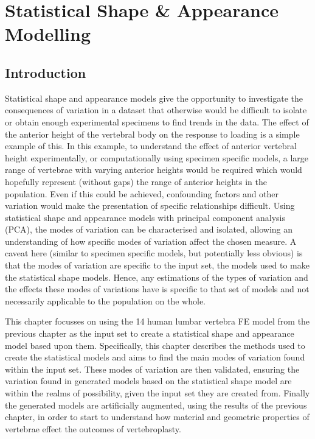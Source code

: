 \chapter{Statistical Shape \& Appearance Modelling}\label{PCA_CHAP}

\section{Introduction}

Statistical shape and appearance models give the opportunity to investigate the
consequences of variation in a dataset that otherwise would be difficult to
isolate or obtain enough experimental specimens to find trends in the data.
The effect of the anterior height of the vertebral body on the response to
loading is a simple example of this. In this example, to understand the effect
of anterior vertebral height experimentally, or computationally using specimen
specific models, a large range of vertebrae with varying anterior heights would
be required which would hopefully represent (without gaps) the range of
anterior heights in the population. Even if this could be achieved, confounding
factors and other variation would make the presentation of specific
relationships difficult. Using statistical shape and appearance models with
principal component analysis (PCA), the modes of variation can be characterised
and isolated, allowing an understanding of how specific modes of variation
affect the chosen measure. A caveat here (similar to specimen specific models,
but potentially less obvious) is that the modes of variation are specific to
the input set, the models used to make the statistical shape models. Hence, any
estimations of the types of variation and the effects these modes of variations
have is specific to that set of models and not necessarily applicable to the
population on the whole.

This chapter focusses on using the 14 human lumbar vertebra FE model from the previous
chapter as the input set to create a statistical shape and appearance model
based upon them. Specifically, this chapter describes the methods used to
create the statistical models and aims to find the main modes of variation found within the
input set. These modes of variation are then validated, ensuring the variation
found in generated models based on the statistical shape model are within the
realms of possibility, given the input set they are created from. Finally the
generated models are artificially augmented, using the results of the previous
chapter, in order to start to understand how material and geometric properties
of vertebrae effect the outcomes of vertebroplasty.

